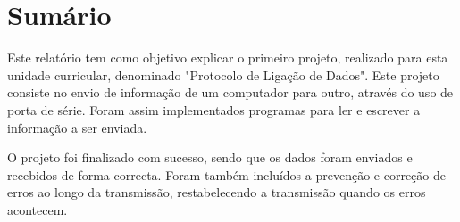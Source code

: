 \documentclass[11pt]{article}
\begin{document}
\newpage
\tableofcontents
\newpage


\newpage

%
%
%
%
%
%
%


\section{Sumário}

Este relatório tem como objetivo explicar o primeiro projeto, realizado para esta unidade curricular, denominado "Protocolo de Ligação de Dados". Este projeto consiste no envio de informação de um computador para outro, através do uso de porta de série. Foram assim implementados programas para ler e escrever a informação a ser enviada.
\par O projeto foi finalizado com sucesso, sendo que os dados foram enviados e recebidos de forma correcta. Foram também incluídos a prevenção e correção de erros ao longo da transmissão, restabelecendo a transmissão quando os erros acontecem.
\end{document}
